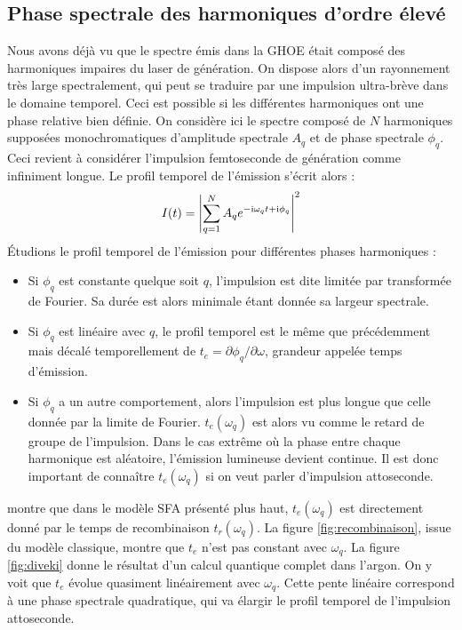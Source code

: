 \subsection{Phase spectrale des harmoniques d'ordre élevé}
Nous avons déjà vu que le spectre émis dans la GHOE était composé des harmoniques impaires du laser de génération. On dispose alors d'un rayonnement très large spectralement, qui peut se traduire par une impulsion ultra-brève dans le domaine temporel. Ceci est possible si les différentes harmoniques ont une phase relative bien définie. On considère ici le spectre composé de $N$ harmoniques supposées monochromatiques d'amplitude spectrale $A_q$ et de phase spectrale $\phi_q$. Ceci revient à considérer l'impulsion femtoseconde de génération comme infiniment longue. Le profil temporel de l'émission s'écrit alors :
\begin{equation}
I(t) = \left|\sum_{q=1}^N A_q e^{-\mathrm{i}\omega_q t+\mathrm{i}\phi_q}\right|^2
\end{equation}
\'Etudions le profil temporel de l'émission pour différentes phases harmoniques :
\begin{itemize}
\renewcommand{\labelitemi}{$\bullet$}
\setlength\itemsep{1em}
\item Si $\phi_q$ est constante quelque soit $q$, l'impulsion est dite limitée par transformée de Fourier. Sa durée est alors minimale étant donnée sa largeur spectrale.
\item Si $\phi_q$ est linéaire avec $q$, le profil temporel est le même que précédemment mais décalé temporellement de $t_e = \partial\phi_q/\partial\omega$, grandeur appelée temps d'émission.
\item Si $\phi_q$ a un autre comportement, alors l'impulsion est plus longue que celle donnée par la limite de Fourier. $t_e(\omega_q)$ est alors vu comme le retard de groupe de l'impulsion. Dans le cas extrême où la phase entre chaque harmonique est aléatoire, l'émission lumineuse devient continue. Il est donc important de connaître $t_e(\omega_q)$ si on veut parler d'impulsion attoseconde.
\end{itemize}
\vspace{\baselineskip}
 montre que dans le modèle SFA présenté plus haut, $t_e(\omega_q)$ est directement donné par le temps de recombinaison $t_r(\omega_q)$. La figure \ref{fig:recombinaison}, issue du modèle classique, montre que $t_e$ n'est pas constant avec $\omega_q$. La figure \ref{fig:diveki} donne le résultat d'un calcul quantique complet dans l'argon. On y voit que $t_e$ évolue quasiment linéairement avec $\omega_q$. Cette pente linéaire correspond à une phase spectrale quadratique, qui va élargir le profil temporel de l'impulsion attoseconde.

